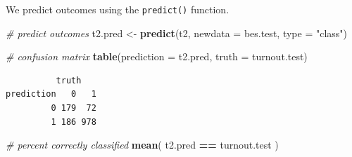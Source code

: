 \documentclass[]{article}
\newenvironment{Shaded}{\begin{snugshade}}{\end{snugshade}}
\newcommand{\CommentTok}[1]{\textcolor[rgb]{0.56,0.35,0.01}{\textit{#1}}}
\newcommand{\DataTypeTok}[1]{\textcolor[rgb]{0.13,0.29,0.53}{#1}}
\newcommand{\DecValTok}[1]{\textcolor[rgb]{0.00,0.00,0.81}{#1}}
\newcommand{\KeywordTok}[1]{\textcolor[rgb]{0.13,0.29,0.53}{\textbf{#1}}}
\newcommand{\NormalTok}[1]{#1}
\newcommand{\OperatorTok}[1]{\textcolor[rgb]{0.81,0.36,0.00}{\textbf{#1}}}
\newcommand{\StringTok}[1]{\textcolor[rgb]{0.31,0.60,0.02}{#1}}
\begin{document}
\begin{Shaded}
\end{Shaded}

We predict outcomes using the \texttt{predict()} function.

\begin{Shaded}
\begin{Highlighting}[]
\CommentTok{# predict outcomes}
\NormalTok{t2.pred <-}\StringTok{ }\KeywordTok{predict}\NormalTok{(t2, }\DataTypeTok{newdata =}\NormalTok{ bes.test, }\DataTypeTok{type =} \StringTok{"class"}\NormalTok{)}

\CommentTok{# confusion matrix}
\KeywordTok{table}\NormalTok{(}\DataTypeTok{prediction =}\NormalTok{ t2.pred, }\DataTypeTok{truth =}\NormalTok{ turnout.test)}
\end{Highlighting}
\end{Shaded}

\begin{verbatim}
          truth
prediction   0   1
         0 179  72
         1 186 978
\end{verbatim}

\begin{Shaded}
\begin{Highlighting}[]
\CommentTok{# percent correctly classified}
\KeywordTok{mean}\NormalTok{( t2.pred }\OperatorTok{==}\StringTok{ }\NormalTok{turnout.test )}
\end{Highlighting}
\end{Shaded}
\end{document}
